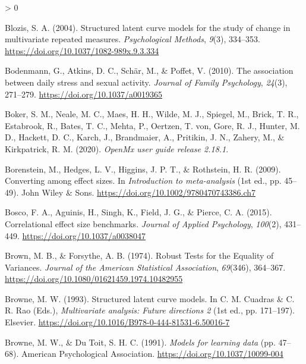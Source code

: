 \documentclass[
12pt, %
twoside,
english]{guelphthesis}
\newlength{\cslhangindent}
\newenvironment{CSLReferences}[2] %
 {%
  \setlength{\parindent}{0pt}
  \ifodd #1 \everypar{\setlength{\hangindent}{\cslhangindent}}\ignorespaces\fi
  \ifnum #2 > 0
  \setlength{\parskip}{\linespacing{2}}
  \fi
 }%
 {}
\theoremstyle{definition}
\theoremstyle{definition}
\theoremstyle{definition}
\theoremstyle{definition}
\theoremstyle{remark}
\begin{document}
\begin{CSLReferences}{1}{0}
\leavevmode{}%
Blozis, S. A. (2004). Structured latent curve models for the study of change in multivariate repeated measures. \emph{Psychological Methods}, \emph{9}(3), 334--353. \url{https://doi.org/10.1037/1082-989x.9.3.334}

\leavevmode{}%
Bodenmann, G., Atkins, D. C., Schär, M., \& Poffet, V. (2010). The association between daily stress and sexual activity. \emph{Journal of Family Psychology}, \emph{24}(3), 271--279. \url{https://doi.org/10.1037/a0019365}

\leavevmode{}%
Boker, S. M., Neale, M. C., Maes, H. H., Wilde, M. J., Spiegel, M., Brick, T. R., Estabrook, R., Bates, T. C., Mehta, P., Oertzen, T. von, Gore, R. J., Hunter, M. D., Hackett, D. C., Karch, J., Brandmaier, A., Pritikin, J. N., Zahery, M., \& Kirkpatrick, R. M. (2020). \emph{OpenMx user guide release 2.18.1}.

\leavevmode{}%
Borenstein, M., Hedges, L. V., Higgins, J. P. T., \& Rothstein, H. R. (2009). {Converting among effect sizes}. In \emph{Introduction to meta-analysis} (1st ed., pp. 45--49). John Wiley {\&} Sons. \url{https://doi.org/10.1002/9780470743386.ch7}

\leavevmode{}%
Bosco, F. A., Aguinis, H., Singh, K., Field, J. G., \& Pierce, C. A. (2015). Correlational effect size benchmarks. \emph{Journal of Applied Psychology}, \emph{100}(2), 431--449. \url{https://doi.org/10.1037/a0038047}

\leavevmode{}%
Brown, M. B., \& Forsythe, A. B. (1974). Robust Tests for the Equality of Variances. \emph{Journal of the American Statistical Association}, \emph{69}(346), 364--367. \url{https://doi.org/10.1080/01621459.1974.10482955}

\leavevmode{}%
Browne, M. W. (1993). Structured latent curve models. In C. M. Cuadras \& C. R. Rao (Eds.), \emph{Multivariate analysis: Future directions 2} (1st ed., pp. 171--197). Elsevier. \url{https://doi.org/10.1016/B978-0-444-81531-6.50016-7}

\leavevmode{}%
Browne, M. W., \& Du Toit, S. H. C. (1991). \emph{Models for learning data} (pp. 47--68). American Psychological Association. \url{https://doi.org/10.1037/10099-004}


\end{CSLReferences}
\end{document}
